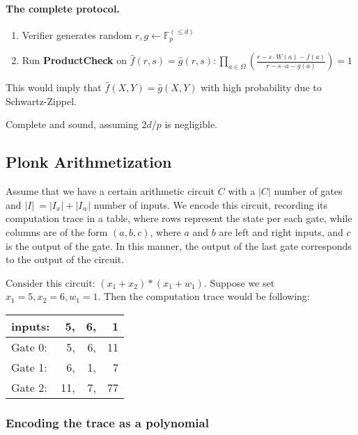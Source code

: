 \documentclass[../lecture-notes.tex]{subfiles}
\begin{document}
\paragraph{The complete protocol.}
\begin{enumerate}
    \item Verifier generates random \(r, g \leftarrow\mathbb{F}_p^{(\leq d)} \)
    \item Run \textbf{ProductCheck} on \(\hat{f}(r, s) = \hat{g}(r, s): \prod_{a \in \Omega} \left( \frac{r - s \cdot W(a) - f(a)}{r - s \cdot a - g(a)} \right) = 1\)
\end{enumerate}

This would imply that \(\hat{f}(X,Y) = \hat{g}(X,Y)\) with high probability due to Schwartz-Zippel.

\begin{remark}
Complete and sound, assuming \(2d/p\) is negligible.
\end{remark}

\subsection{Plonk Arithmetization}

Assume that we have a certain arithmetic circuit \(C\) with a \(|C|\) number of gates and \(|I|\ = |I_x| + |I_w|\) number of inputs. We encode this circuit, recording its computation trace in a table, where rows represent the state per each gate, while columns are of the form \((a, b, c)\), where \(a\) and \(b\) are left and right inputs, and \(c\) is the output of the gate. In this manner, the output of the last gate corresponds to the output of the circuit.

\begin{example}
Consider this circuit: \((x_1 + x_2)*(x_1 + w_1)\). Suppose we set \(x_1 = 5, x_2 = 6, w_1 = 1\). Then the computation trace would be following:

\begin{tabular}{l rrr}
  inputs: & 5, & 6, & 1 \\ \hline
  Gate 0: & 5, & 6, & 11 \\
  Gate 1: & 6, & 1, & 7 \\
  Gate 2: & 11, & 7, & 77 \\ 
\end{tabular}

\end{example}

\subsubsection{Encoding the trace as a polynomial}
\end{document}

